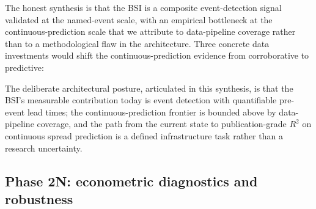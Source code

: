 \documentclass[11pt,a4paper]{article}
\begin{document}
The honest synthesis is that the BSI is a composite event-detection signal validated at the named-event scale, with an empirical bottleneck at the continuous-prediction scale that we attribute to data-pipeline coverage rather than to a methodological flaw in the architecture. Three concrete data investments would shift the continuous-prediction evidence from corroborative to predictive:

\begin{table}[h]
\centering\footnotesize
{}
\caption{Phase 2I infrastructure roadmap. The largest single $R^2$ lift comes from replacing the HY OAS aggregate target with per-firm spread series, which would let the CFPB consumer signal map directly to firm credit response rather than aggregating away. The remaining two investments close the populated-pillar gap from six-of-eight to eight-of-eight.}
\label{tab:phase2_roadmap}
\end{table}

The deliberate architectural posture, articulated in this synthesis, is that the BSI's measurable contribution today is event detection with quantifiable pre-event lead times; the continuous-prediction frontier is bounded above by data-pipeline coverage, and the path from the current state to publication-grade $R^2$ on continuous spread prediction is a defined infrastructure task rather than a research uncertainty.

\subsection{Phase 2N: econometric diagnostics and robustness}\label{sec:results_phase2N}
\end{document}
